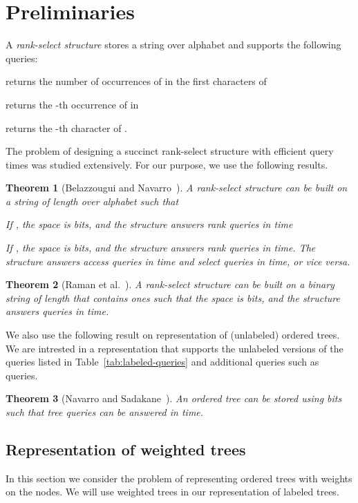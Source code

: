 \documentclass[12pt]{article}
\newtheorem{theorem}{Theorem}
\begin{document}
\section{Preliminaries}
A \emph{rank-select structure} stores a string  over alphabet
 and supports the following queries:
\begin{inparaenum}[(1)]
\item
 returns the number of occurrences of  in the first
 characters of 
\item
 returns the -th occurrence of  in 
\item
 returns the -th character of .
\end{inparaenum}
The problem of designing a succinct rank-select structure with efficient query
times was studied extensively. For our purpose, we use the following results.
\begin{theorem}[Belazzougui and Navarro~\cite{BelazzouguiN12}]
\label{thm:rank-select}
A rank-select structure can be built on a string  of length 
over alphabet  such that
\begin{inparaenum}[(1)]
\item
If , the space is  bits,
and the structure answers rank queries in  time
\item
If , the space is  bits,
and the structure answers rank queries
in  time.
The structure answers access queries in  time and select
queries in  time, or vice versa.
\end{inparaenum}
\end{theorem}
\begin{theorem}[Raman et al.~\cite{RamanRS07}]
\label{thm:rank-select-binary}
A rank-select structure can be built on a binary string  of length 
that contains  ones
such that the space is  bits, and
the structure answers queries in  time.
\end{theorem}

We also use the following result on representation of (unlabeled) ordered trees.
We are intrested in a representation that supports
the unlabeled versions of the queries listed in Table~\ref{tab:labeled-queries}
and additional queries such as  queries.
\begin{theorem}[Navarro and Sadakane~\cite{NavarroS14}]
\label{thm:unlabeled-tree}
An ordered tree can be stored using  bits such that
tree queries can be answered in  time.
\end{theorem}

\subsection{Representation of weighted trees}
In this section we consider the problem of representing ordered trees with
weights on the nodes. We will use weighted trees in our representation of
labeled trees.
\end{document}
